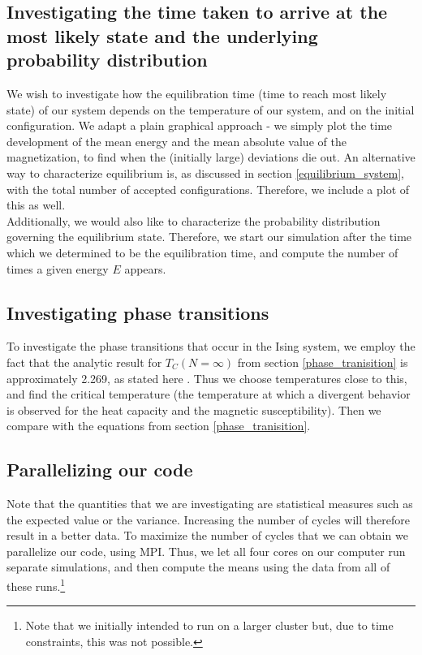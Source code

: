 \documentclass[a4paper, 10pt]{article}
\begin{document}
\subsection{Investigating the time taken to arrive at the most likely state and the underlying probability distribution}
We wish to investigate how the equilibration time (time to reach most likely state) of our system depends on the temperature of our system, and on the initial configuration. We adapt a plain graphical approach - we simply plot the time development of the mean energy and the mean absolute value of the magnetization, to find when the (initially large) deviations die out. An alternative way to characterize equilibrium is, as discussed in section \ref{equilibrium_system}, with the total number of accepted configurations. Therefore, we include a plot of this as well.\\
\linebreak
Additionally, we would also like to characterize the probability distribution governing the equilibrium state. Therefore, we start our simulation after the time which we determined to be the equilibration time, and compute the number of times a given energy $E$ appears.
\subsection{Investigating phase transitions}
To investigate the phase transitions that occur in the Ising system, we employ the fact that the analytic result for $T_C(N=\infty)$ from section \ref{phase_tranisition} is approximately 2.269, as stated here \cite{Project}. Thus we choose temperatures close to this, and find the critical temperature (the temperature at which a divergent behavior is observed for the heat capacity and the magnetic susceptibility). Then we compare with the equations from section \ref{phase_tranisition}.
\subsection{Parallelizing our code}
Note that the quantities that we are investigating are statistical measures such as the expected value or the variance. Increasing the number of cycles will therefore result in a better data. To maximize the number of cycles that we can obtain we parallelize our code, using MPI. Thus, we let all four cores on our computer run separate simulations, and then compute the means using the data from all of these runs.\footnote{Note that we initially intended to run on a larger cluster but, due to time constraints, this was not possible.}
\newpage
\end{document}
